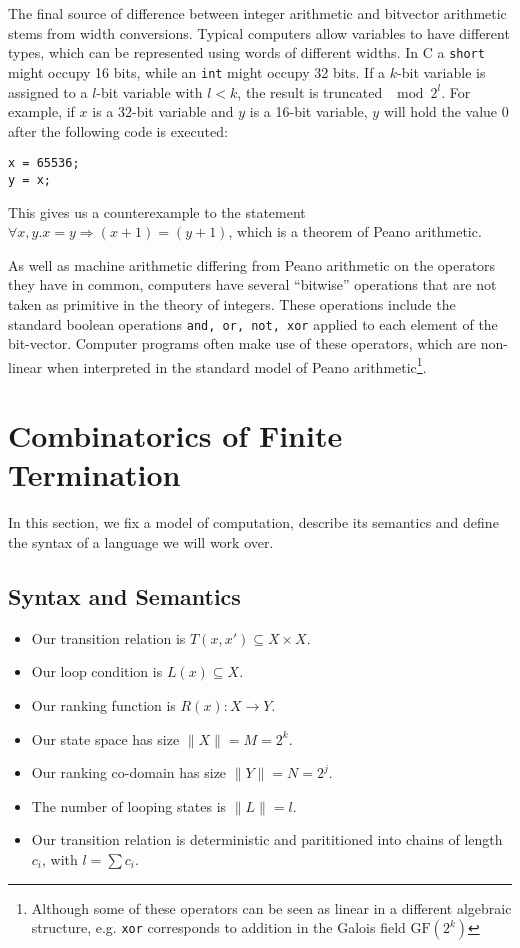 \documentclass[preprint]{sigplanconf}
\theoremstyle{definition}
\begin{document}
The final source of difference between integer arithmetic and bitvector arithmetic stems from width conversions.
Typical computers allow variables to have different types, which can be represented using words of different widths.
In C a \texttt{short} might occupy
16 bits, while an \texttt{int} might occupy 32 bits.  If a $k$-bit variable is assigned to a $l$-bit variable
with $l < k$, the result is truncated $\mod 2^l$.  For example, if $x$ is a 32-bit variable and $y$ is a 16-bit
variable, $y$ will hold the value $0$ after the following code is executed:

\begin{lstlisting}
x = 65536;
y = x;
\end{lstlisting}

This gives us a counterexample to the statement $\forall x, y . x = y \Rightarrow (x + 1) = (y + 1)$,
which is a theorem of Peano arithmetic.

As well as machine arithmetic differing from Peano arithmetic on the operators they have in common,
computers have several ``bitwise'' operations that are not taken as primitive in the theory of
integers.  These operations include the standard boolean operations \texttt{and, or, not, xor}
applied to each element of the bit-vector.  Computer programs often make use of these operators,
which are non-linear when interpreted in the standard model of Peano arithmetic\footnote{
Although some of these operators can be seen as linear in a different algebraic structure,
e.g. \texttt{xor} corresponds to addition in the Galois field $\mathrm{GF}(2^k)$}.

\iffalse
\section{Combinatorics of Finite Termination}
In this section, we fix a model of computation, describe its semantics and
define the syntax of a language we will work over.

\subsection{Syntax and Semantics}

\begin{itemize}
 \item Our transition relation is $T(x, x') \subseteq X \times X$.
 \item Our loop condition is $L(x) \subseteq X$.
 \item Our ranking function is $R(x) : X \to Y$.
 \item Our state space has size $\| X \| = M = 2^k$.
 \item Our ranking co-domain has size $\| Y \| = N = 2^j$.
 \item The number of looping states is $\| L \| = l$.
 \item Our transition relation is deterministic and parititioned into chains of length $c_i$, with $l = \sum c_i$.
\end{itemize}
\end{document}
